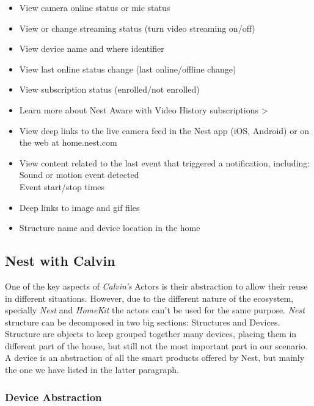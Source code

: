 \begin{itemize}
    \item View camera online status or mic status
    \item View or change streaming status (turn video streaming on/off)
    \item View device name and where identifier
    \item View last online status change (last online/offline change)
    \item View subscription status (enrolled/not enrolled)
    \item Learn more about Nest Aware with Video History subscriptions >
    \item View deep links to the live camera feed in the Nest app (iOS, Android) or on the web at home.nest.com
    \item View content related to the last event that triggered a notification, including:
        \\Sound or motion event detected
        \\Event start/stop times
    \item Deep links to image and gif files
    \item Structure name and device location in the home

\end{itemize}



\subsection{Nest with Calvin}

One of the key aspects of \textit{Calvin's} Actors is their abstraction
to allow their reuse in different situations. However, due to the different
nature of the ecosystem, specially \textit{Nest} and \textit{HomeKit} the actors
can't be used for the same purpose.
\textit{Nest} structure can be decomposed in two big sections: Structures and Devices.
Structure are objects to keep grouped together many devices, placing them in different part of the house,
but still not the most important part in our scenario.\\
A device is an abstraction of all the smart products offered by Nest, but mainly the one we have listed in the latter
paragraph.

\subsubsection{Device Abstraction}

